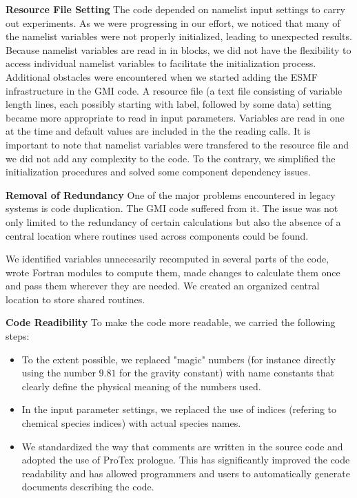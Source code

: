 \documentclass[11pt]{article}
\def\bi{\begin{itemize}}
\def\ei{\end{itemize}}
\begin{document}
\noindent
{\bf Resource File Setting} \newline
The code depended on namelist input settings to carry out experiments.
As we were progressing in our effort, we noticed that many of the namelist
variables were not properly initialized, leading to unexpected results.
Because namelist variables are read in in blocks, we did not have the flexibility
to access individual namelist variables to facilitate the initialization process.
Additional obstacles were encountered when we started adding the ESMF infrastructure
in the GMI code.
A resource file (a text file consisting of variable length lines, 
each possibly starting with label, followed by some data) setting became 
more appropriate to read in input parameters.
Variables are read in one at the time and default values are included in the
the reading calls.
It is important to note that namelist variables were transfered to the resource
file and we did not add any complexity to the code.
To the contrary, we simplified the initialization procedures and solved 
some component dependency issues.

\vskip 0.60cm

\noindent
{\bf Removal of Redundancy} \newline
One of the major problems encountered in legacy systems is code duplication.
The GMI code suffered from it.
The issue was not only limited to the redundancy of certain calculations but
also the absence of a central location where routines used across components
could be found.

We identified variables unnecesarily recomputed in several parts of the code,
wrote Fortran modules to compute them,
made changes to calculate them once and pass them wherever they are needed.
We created an organized central location to store shared routines.

\vskip 0.60cm

\noindent
{\bf Code Readibility} \newline
To make the code more readable, we carried the following steps:
\bi
\item To the extent possible, we replaced "magic" numbers (for instance directly
      using the number $9.81$ for the gravity constant) with name constants that
      clearly define the physical meaning of the numbers used.
\item In the input parameter settings, we replaced the use of indices (refering to
      chemical species indices) with actual species names.
\item We standardized the way that comments are written in the source code
      and adopted the use of ProTex prologue.
      This has significantly improved the code readability and has allowed
      programmers and users to automatically generate documents describing the code.
\ei
\end{document}
